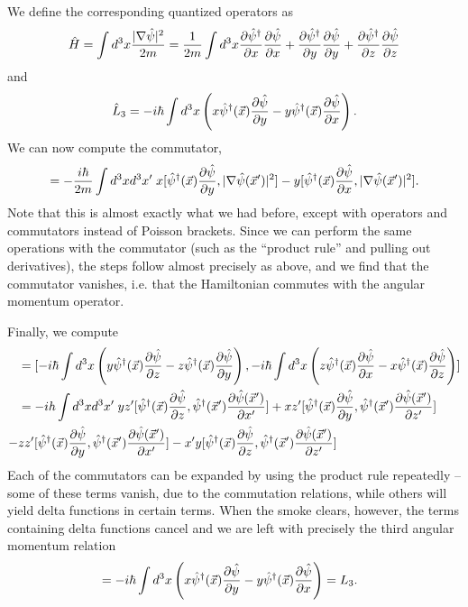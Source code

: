 \documentclass{../mathnotes}
\begin{document}
We define the corresponding quantized operators as
\begin{align*}
    \hat H=\int d^3x \frac{|\nabla\hat\psi|^2}{2m}=\frac{1}{2m}\int d^3x \frac{\partial\hat\psi^\dagger}{\partial x}\frac{\partial\hat\psi}{\partial x}+\frac{\partial\hat\psi^\dagger}{\partial y}\frac{\partial\hat\psi}{\partial y}
    +\frac{\partial\hat\psi^\dagger}{\partial z}\frac{\partial\hat\psi}{\partial z}
\end{align*}
and
\begin{align*}
    \hat L_3=-i\hbar\int d^3x \left( x\hat\psi^\dagger(\vec x)\frac{\partial \hat\psi}{\partial y} - y\hat\psi^\dagger(\vec x)\frac{\partial \hat\psi}{\partial x} \right).
\end{align*}
We can now compute the commutator,
\begin{align*}
    [\hat L_3,\hat H]=-\frac{i\hbar}{2m}\int d^3x d^3x'\;x[\hat\psi^\dagger(\vec x)\frac{\p \hat\psi}{\p y},|\nabla\hat\psi(\vec x')|^2]-
    y[\hat\psi^\dagger(\vec x)\frac{\p \hat\psi}{\p x},|\nabla\hat\psi(\vec x')|^2].
\end{align*}
Note that this is almost exactly what we had before, except with operators and commutators instead of Poisson brackets.
Since we can perform the same operations with the commutator (such as the ``product rule'' and pulling out derivatives), the steps follow almost precisely
as above, and we find that the commutator vanishes, i.e. that the Hamiltonian commutes with the angular momentum operator.

Finally, we compute
\begin{align*}
    [\hat L_1,\hat L_2]&=
    [-i\hbar\int d^3x \left( y\hat\psi^\dagger(\vec x)\frac{\p \hat\psi}{\p z} - z\hat\psi^\dagger(\vec x)\frac{\p \hat\psi}{\p y} \right),
    -i\hbar\int d^3x \left( z\hat\psi^\dagger(\vec x)\frac{\p \hat\psi}{\p x} - x\hat\psi^\dagger(\vec x)\frac{\p \hat\psi}{\p z} \right)]\\
    &=-ih\int d^3x d^3x'\;yz'[\hat\psi^\dagger(\vec x)\frac{\p\hat\psi}{\p z},\hat\psi^\dagger(\vec x')\frac{\p \hat\psi(\vec x')}{\p x'}]+
    xz'[\hat\psi^\dagger(\vec x)\frac{\p\hat\psi}{\p y},\hat\psi^\dagger(\vec x')\frac{\p \hat\psi(\vec x')}{\p z'}]\\
    -&zz'[\hat\psi^\dagger(\vec x)\frac{\p\hat\psi}{\p y},\hat\psi^\dagger(\vec x')\frac{\p \hat\psi(\vec x')}{\p x'}]-
    x'y[\hat\psi^\dagger(\vec x)\frac{\p\hat\psi}{\p z},\hat\psi^\dagger(\vec x')\frac{\p \hat\psi(\vec x')}{\p z'}]
\end{align*}
Each of the commutators can be expanded by using the product rule repeatedly -- some of these terms vanish, due to the commutation relations,
while others will yield delta functions in certain terms.
When the smoke clears, however, the terms containing delta functions cancel and  we are left with precisely the third angular momentum
relation
\begin{align*}
    [\hat L_1,\hat L_2]&=-i\hbar\int d^3x \left( x\hat\psi^\dagger(\vec x)\frac{\p \hat\psi}{\p y} - y\hat\psi^\dagger(\vec x)\frac{\p \hat\psi}{\p x} \right)
    =L_3.
\end{align*}
\end{document}
